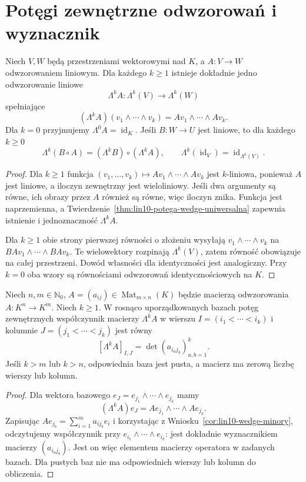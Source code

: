 \section{Potęgi zewnętrzne odwzorowań i wyznacznik}
\label{sec:lin10-operator-wedge}

\begin{twierdzenie}
\label{thm:lin10-potega-operatora}
Niech \(V,W\) będą przestrzeniami
wektorowymi nad \(K\), a
\(A\colon V\to W\) odwzorowaniem liniowym.
Dla każdego \(k\ge1\) istnieje dokładnie
jedno odwzorowanie liniowe
\[
 \Lambda^k A\colon\Lambda^k(V)\to\Lambda^k(W)
\]
spełniające
\[
 (\Lambda^k A)(v_1\wedge\cdots\wedge v_k)
 =Av_1\wedge\cdots\wedge Av_k.
\]
Dla \(k=0\) przyjmujemy
\(\Lambda^0 A=\operatorname{id}_K\).
Jeśli \(B\colon W\to U\) jest liniowe,
to dla każdego \(k\ge0\)
\[
 \Lambda^k(B\circ A)
 =(\Lambda^k B)\circ(\Lambda^k A),
 \qquad
 \Lambda^k(\operatorname{id}_V)
 =\operatorname{id}_{\Lambda^k(V)}.
\]
\end{twierdzenie}
\begin{proof}
Dla \(k\ge1\) funkcja
\((v_1,\ldots,v_k)\mapsto
 Av_1\wedge\cdots\wedge Av_k\)
jest \(k\)-liniowa, ponieważ
\(A\) jest liniowe, a iloczyn
zewnętrzny jest wieloliniowy.
Jeśli dwa argumenty są równe,
ich obrazy przez \(A\) również
są równe, więc iloczyn znika.
Funkcja jest naprzemienna,
a
Twierdzenie~\ref{thm:lin10-potega-wedge-uniwersalna}
zapewnia istnienie i
jednoznaczność \(\Lambda^k A\).

Dla \(k\ge1\) obie strony
pierwszej równości o złożeniu
wysyłają
\(v_1\wedge\cdots\wedge v_k\)
na \(BA v_1\wedge\cdots\wedge BA v_k\).
Te wielowektory rozpinają
\(\Lambda^k(V)\), zatem
równość obowiązuje na całej
przestrzeni. Dowód własności
dla identyczności jest analogiczny.
Przy \(k=0\) oba wzory są
równościami odwzorowań
identycznościowych na \(K\).
\end{proof}

\begin{twierdzenie}
\label{thm:lin10-minory}
Niech \(n,m\in\mathbb N_0\),
\(A=(a_{ij})\in\operatorname{Mat}_{m\times n}(K)\)
będzie macierzą odwzorowania
\(A\colon K^n\to K^m\).
Niech \(k\ge1\).
W rosnąco uporządkowanych bazach
potęg zewnętrznych współczynnik
macierzy \(\Lambda^k A\)
w wierszu
\(I=(i_1<\cdots<i_k)\)
i kolumnie
\(J=(j_1<\cdots<j_k)\)
jest równy
\[
 [\Lambda^k A]_{I,J}
 =\det(a_{i_a j_b})_{a,b=1}^{k}.
\]
Jeśli \(k>m\) lub \(k>n\),
odpowiednia baza jest pusta,
a macierz ma zerową liczbę
wierszy lub kolumn.
\end{twierdzenie}
\begin{proof}
Dla wektora bazowego
\(e_J=e_{j_1}\wedge\cdots\wedge e_{j_k}\)
mamy
\[
 (\Lambda^k A)e_J
 =Ae_{j_1}\wedge\cdots\wedge Ae_{j_k}.
\]
Zapisując
\(Ae_{j_b}=\sum_{i=1}^m a_{i j_b}e_i\)
i korzystając z
Wniosku~\ref{cor:lin10-wedge-minory},
odczytujemy współczynnik przy
\(e_{i_1}\wedge\cdots\wedge e_{i_k}\):
jest dokładnie wyznacznikiem
macierzy \((a_{i_a j_b})\).
Jest on więc elementem
macierzy operatora w zadanych
bazach. Dla pustych baz
nie ma odpowiednich
wierszy lub kolumn do obliczenia.
\end{proof}

